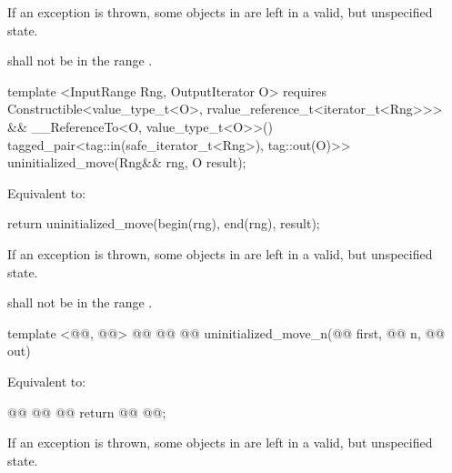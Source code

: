 \pnum
\remarks If an exception is thrown, some objects in \tcode{[first, last)} are left in a valid, but unspecified state.

{\color{addclr}
\pnum
\requires {} shall not be in the range \tcode{[first, last)}.

\begin{codeblock}
  template <InputRange Rng, OutputIterator O>
    requires Constructible<value_type_t<O>, rvalue_reference_t<iterator_t<Rng>>> &&
             __ReferenceTo<O, value_type_t<O>>()
  tagged_pair<tag::in(safe_iterator_t<Rng>), tag::out(O)>>
    uninitialized_move(Rng&& rng, O result);
\end{codeblock}

\pnum
\effects Equivalent to:
\begin{codeblock}
        return uninitialized_move(begin(rng), end(rng), result);
\end{codeblock}

\pnum
\remarks If an exception is thrown, some objects in \tcode{[first, last)} are left in a valid, but unspecified state.

\pnum
\requires {} shall not be in the range \tcode{[first, last)}.
} %

\begin{codeblock}
  template <@@, @@>
    @@
             @@
  @@
    uninitialized_move_n(@@ first, @@ n, @@ out)
\end{codeblock}


\pnum
\effects Equivalent to:
\begin{codeblock}
        @@
          @@
            @@
        return @@
                                                                       @@;
\end{codeblock}

\pnum
\remarks If an exception is thrown, some objects in \tcode{[first, next(first, n))} are left in a valid, but unspecified state.

